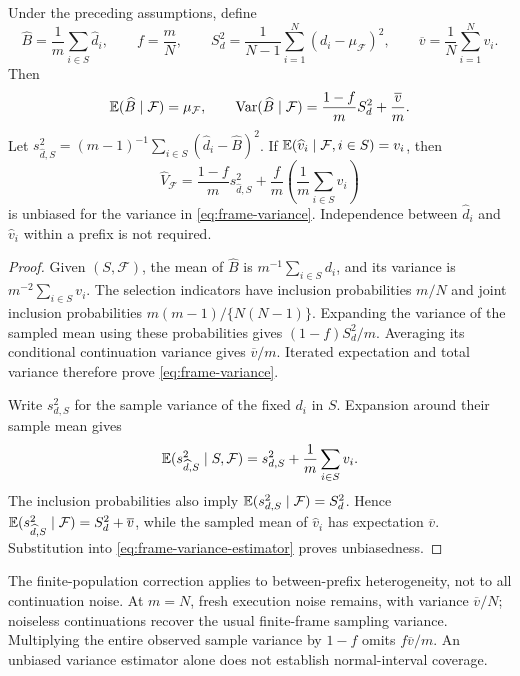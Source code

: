 \begin{proposition}
\label{prop:fixed-frame-branches}
Under the preceding assumptions, define
\[
 \widehat B=\frac1m\sum_{i\in S}\widehat d_i,\qquad
 f=\frac mN,\qquad
 S_d^2=\frac1{N-1}\sum_{i=1}^N(d_i-\mu_{\mathcal F})^2,\qquad
 \overline v=\frac1N\sum_{i=1}^N v_i.
\]
Then
\begin{equation}
 \mathbb{E}(\widehat B\mid\mathcal F)=\mu_{\mathcal F},\qquad
 \operatorname{Var}(\widehat B\mid\mathcal F)=\frac{1-f}{m}S_d^2+\frac{\overline v}{m}.
 \label{eq:frame-variance}
\end{equation}
Let $s_{\widehat d,S}^2=(m-1)^{-1}\sum_{i\in S}(\widehat d_i-\widehat B)^2$. If $\mathbb{E}(\widehat v_i\mid\mathcal F,i\in S)=v_i$, then
\begin{equation}
 \widehat V_{\mathcal F}
 =\frac{1-f}{m}s_{\widehat d,S}^2
 +\frac f m\left(\frac1m\sum_{i\in S}\widehat v_i\right)
 \label{eq:frame-variance-estimator}
\end{equation}
is unbiased for the variance in \eqref{eq:frame-variance}. Independence between $\widehat d_i$ and $\widehat v_i$ within a prefix is not required.
\end{proposition}

\begin{proof}
Given $(S,\mathcal F)$, the mean of $\widehat B$ is $m^{-1}\sum_{i\in S}d_i$, and its variance is $m^{-2}\sum_{i\in S}v_i$. The selection indicators have inclusion probabilities $m/N$ and joint inclusion probabilities $m(m-1)/\{N(N-1)\}$. Expanding the variance of the sampled mean using these probabilities gives $(1-f)S_d^2/m$. Averaging its conditional continuation variance gives $\overline v/m$. Iterated expectation and total variance therefore prove \eqref{eq:frame-variance}.

Write $s_{d,S}^2$ for the sample variance of the fixed $d_i$ in $S$. Expansion around their sample mean gives
\[
 \mathbb{E}(s_{\widehat d,S}^2\mid S,\mathcal F)
 =s_{d,S}^2+\frac1m\sum_{i\in S}v_i.
\]
The inclusion probabilities also imply $\mathbb{E}(s_{d,S}^2\mid\mathcal F)=S_d^2$. Hence $\mathbb{E}(s_{\widehat d,S}^2\mid\mathcal F)=S_d^2+\overline v$, while the sampled mean of $\widehat v_i$ has expectation $\overline v$. Substitution into \eqref{eq:frame-variance-estimator} proves unbiasedness.
\end{proof}

The finite-population correction applies to between-prefix heterogeneity, not to all continuation noise. At $m=N$, fresh execution noise remains, with variance $\overline v/N$; noiseless continuations recover the usual finite-frame sampling variance. Multiplying the entire observed sample variance by $1-f$ omits $f\overline v/m$. An unbiased variance estimator alone does not establish normal-interval coverage.

